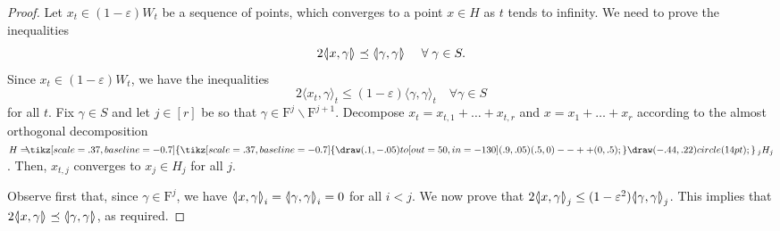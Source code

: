 \documentclass[AHL,Unicode,longabstracts]{cedram}
\makeatletter
\newcommand{\symbuptm}{\tikz[scale=.37, baseline=-0.7]{\draw(.1,-.05)to[out=50,in=-130](.9,.05) (.5,0)--++(0,.5);}}
\newcommand{\almorth}{\tikz[scale=.37, baseline=-0.7]{\symbuptm \draw (-.44,.22) circle (14pt);}}
\newcommand{\aplus}{\hspace{-.2cm}\almorth\,}
\newcommand{\innone}[2]{{\langle#2\rangle_{#1}}}
\newcommand{\llangle}{\mathopen{\langle\mkern -3.1mu\lvert}}
\newcommand{\rrangle}{\mathclose{\rvert\mkern -3.1mu\rangle}}
\newcommand{\highinn}[2]{{\llangle#2\rrangle_{#1}}}
\DeclareMathOperator{\Vor}{Vor}
\DeclareMathOperator{\intt}{int}
\newcommand{\filter}{\mathrm{F}}
\newcommand{\R}{\mathbb{R}}
\newcommand{\interior}[1]{\intt(#1)}
\let\save@mathaccent\mathaccent
\newcommand*\if@single[3]{%
  \setbox0\hbox{${\mathaccent"0362{#1}}^H$}%
  \setbox2\hbox{${\mathaccent"0362{\kern0pt#1}}^H$}%
  \ifdim\ht0=\ht2 #3\else #2\fi
  }
\newcommand*\rel@kern[1]{\kern#1\dimexpr\macc@kerna}
\newcommand*\widebar[1]{\@ifnextchar^{{\wide@bar{#1}{0}}}{\wide@bar{#1}{1}}}
\newcommand*\wide@bar[2]{\if@single{#1}{\wide@bar@{#1}{#2}{1}}{\wide@bar@{#1}{#2}{2}}}
\newcommand*\wide@bar@[3]{%
  \begingroup
  \def\mathaccent##1##2{%
    \let\mathaccent\save@mathaccent
    \if#32 \let\macc@nucleus\first@char \fi
    \setbox\z@\hbox{$\macc@style{\macc@nucleus}_{}$}%
    \setbox\tw@\hbox{$\macc@style{\macc@nucleus}{}_{}$}%
    \dimen@\wd\tw@
    \advance\dimen@-\wd\z@
    \divide\dimen@ 3
    \@tempdima\wd\tw@
    \advance\@tempdima-\scriptspace
    \divide\@tempdima 10
    \advance\dimen@-\@tempdima
    \ifdim\dimen@>\z@ \dimen@0pt\fi
    \rel@kern{0.6}\kern-\dimen@
    \if#31
      \overline{\rel@kern{-0.6}\kern\dimen@\macc@nucleus\rel@kern{0.4}\kern\dimen@}%
      \advance\dimen@0.4\dimexpr\macc@kerna
      \let\final@kern#2%
      \ifdim\dimen@<\z@ \let\final@kern1\fi
      \if\final@kern1 \kern-\dimen@\fi
    \else
      \overline{\rel@kern{-0.6}\kern\dimen@#1}%
    \fi
  }%
  \macc@depth\@ne
  \let\math@bgroup\@empty \let\math@egroup\macc@set@skewchar
  \mathsurround\z@ \frozen@everymath{\mathgroup\macc@group\relax}%
  \macc@set@skewchar\relax
  \let\mathaccentV\macc@nested@a
  \if#31
    \macc@nested@a\relax111{#1}%
  \else
    \def\gobble@till@marker##1\endmarker{}%
    \futurelet\first@char\gobble@till@marker#1\endmarker
    \ifcat\noexpand\first@char A\else
      \def\first@char{}%
    \fi
    \macc@nested@a\relax111{\first@char}%
  \fi
  \endgroup
}
\let\oldbar\bar
\renewcommand*{\bar}[1]{{\mathchoice{\widebar{#1}}{\widebar{#1}}{\widebar{#1}}{\oldbar{#1}}}}
\let\oldforall\forall
\renewcommand*{\forall}{\mathrel{\oldforall}}
\makeatother
\begin{document}

\begin{proof}
Let $x_t \in (1-\varepsilon)W_t$ be a sequence of points, which converges to a point $x \in H$ as $t$ tends to infinity. We need to prove the inequalities
\[
2\highinn{}{x,\gamma} \preceq \highinn{}{\gamma,\gamma} \quad \forall \gamma \in S.
\]
Since $x_t \in (1-\varepsilon)W_t$, we have the inequalities
\[
2 \innone{t}{x_t,\gamma} \leq (1-\varepsilon)\innone{t}{\gamma, \gamma} \quad \forall \gamma \in S
\]
for all $t$. Fix $\gamma \in S$ and let $j\in [r]$ be so that $\gamma \in \filter^j \smallsetminus \filter^{j+1}$. Decompose $x_t = x_{t,1}+ \dots+x_{t,r}$ and $x = x_1+\dots+x_r$ according to the almost orthogonal decomposition $H =\aplus_j H_j$. Then, $x_{t,j}$ converges to $x_j \in H_j$ for all $j$.

Observe first that, since $\gamma \in \filter^j$, we have $\highinn{i}{x,\gamma} =\highinn{i}{\gamma,\gamma}=0$ for all $i<j$. We now prove that $2\highinn{j}{x,\gamma} \leq (1- \varepsilon^2)\highinn{j}{\gamma, \gamma}$. This implies that $2\highinn{}{x,\gamma} \preceq \highinn{}{\gamma,\gamma}$, as required.


\end{proof}
\end{document}
